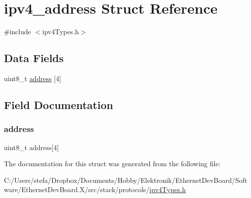 \hypertarget{structipv4__address}{}\section{ipv4\+\_\+address Struct Reference}
\label{structipv4__address}


{\ttfamily \#include $<$ipv4\+Types.\+h$>$}

\subsection*{Data Fields}
\begin{DoxyCompactItemize}
\item 
uint8\+\_\+t \mbox{\hyperlink{structipv4__address_addf23a7962e43c9ba2ed54c76bd937d3}{address}} \mbox{[}4\mbox{]}
\end{DoxyCompactItemize}


\subsection{Field Documentation}
\mbox{\label{structipv4__address_addf23a7962e43c9ba2ed54c76bd937d3}} 
\subsubsection{\texorpdfstring{address}{address}}
{\footnotesize\ttfamily uint8\+\_\+t address\mbox{[}4\mbox{]}}



The documentation for this struct was generated from the following file\+:\begin{DoxyCompactItemize}
\item 
C\+:/\+Users/stefa/\+Dropbox/\+Documents/\+Hobby/\+Elektronik/\+Ethernet\+Dev\+Board/\+Software/\+Ethernet\+Dev\+Board.\+X/src/stack/protocols/\mbox{\hyperlink{ipv4_types_8h}{ipv4\+Types.\+h}}\end{DoxyCompactItemize}
